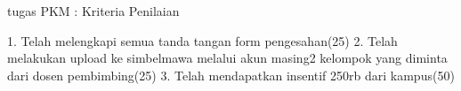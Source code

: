 tugas PKM :
Kriteria Penilaian

1. Telah melengkapi semua tanda tangan form pengesahan(25)
2. Telah melakukan upload ke simbelmawa melalui akun masing2 kelompok yang diminta dari dosen pembimbing(25)
3. Telah mendapatkan insentif 250rb dari kampus(50)